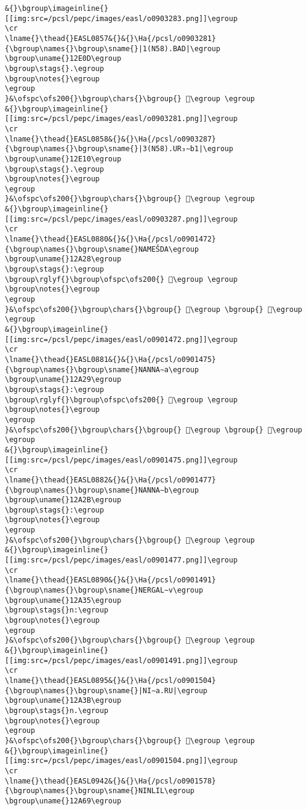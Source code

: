 \begin{verbatim}
&{}\bgroup\imageinline{}[[img:src=/pcsl/pepc/images/easl/o0903283.png]]\egroup
\cr
\lname{}\thead{}EASL0857&{}&{}\Ha{/pcsl/o0903281}{\bgroup\names{}\bgroup\sname{}|1(N58).BAD|\egroup
\bgroup\uname{}12E0D\egroup
\bgroup\stags{}.\egroup
\bgroup\notes{}\egroup
\egroup
}&\ofspc\ofs200{}\bgroup\chars{}\bgroup{} 𒸍\egroup \egroup
&{}\bgroup\imageinline{}[[img:src=/pcsl/pepc/images/easl/o0903281.png]]\egroup
\cr
\lname{}\thead{}EASL0858&{}&{}\Ha{/pcsl/o0903287}{\bgroup\names{}\bgroup\sname{}|3(N58).UR₃∼b1|\egroup
\bgroup\uname{}12E10\egroup
\bgroup\stags{}.\egroup
\bgroup\notes{}\egroup
\egroup
}&\ofspc\ofs200{}\bgroup\chars{}\bgroup{} 𒸐\egroup \egroup
&{}\bgroup\imageinline{}[[img:src=/pcsl/pepc/images/easl/o0903287.png]]\egroup
\cr
\lname{}\thead{}EASL0880&{}&{}\Ha{/pcsl/o0901472}{\bgroup\names{}\bgroup\sname{}NAMEŠDA\egroup
\bgroup\uname{}12A28\egroup
\bgroup\stags{}:\egroup
\bgroup\rglyf{}\bgroup\ofspc\ofs200{} 𒨨\egroup \egroup
\bgroup\notes{}\egroup
\egroup
}&\ofspc\ofs200{}\bgroup\chars{}\bgroup{} 𒨧\egroup \bgroup{} 𒨨\egroup \egroup
&{}\bgroup\imageinline{}[[img:src=/pcsl/pepc/images/easl/o0901472.png]]\egroup
\cr
\lname{}\thead{}EASL0881&{}&{}\Ha{/pcsl/o0901475}{\bgroup\names{}\bgroup\sname{}NANNA∼a\egroup
\bgroup\uname{}12A29\egroup
\bgroup\stags{}:\egroup
\bgroup\rglyf{}\bgroup\ofspc\ofs200{} 𒨩\egroup \egroup
\bgroup\notes{}\egroup
\egroup
}&\ofspc\ofs200{}\bgroup\chars{}\bgroup{} 𒨩\egroup \bgroup{} 𒨪\egroup \egroup
&{}\bgroup\imageinline{}[[img:src=/pcsl/pepc/images/easl/o0901475.png]]\egroup
\cr
\lname{}\thead{}EASL0882&{}&{}\Ha{/pcsl/o0901477}{\bgroup\names{}\bgroup\sname{}NANNA∼b\egroup
\bgroup\uname{}12A2B\egroup
\bgroup\stags{}:\egroup
\bgroup\notes{}\egroup
\egroup
}&\ofspc\ofs200{}\bgroup\chars{}\bgroup{} 𒨫\egroup \egroup
&{}\bgroup\imageinline{}[[img:src=/pcsl/pepc/images/easl/o0901477.png]]\egroup
\cr
\lname{}\thead{}EASL0890&{}&{}\Ha{/pcsl/o0901491}{\bgroup\names{}\bgroup\sname{}NERGAL∼v\egroup
\bgroup\uname{}12A35\egroup
\bgroup\stags{}n:\egroup
\bgroup\notes{}\egroup
\egroup
}&\ofspc\ofs200{}\bgroup\chars{}\bgroup{} 𒨵\egroup \egroup
&{}\bgroup\imageinline{}[[img:src=/pcsl/pepc/images/easl/o0901491.png]]\egroup
\cr
\lname{}\thead{}EASL0895&{}&{}\Ha{/pcsl/o0901504}{\bgroup\names{}\bgroup\sname{}|NI∼a.RU|\egroup
\bgroup\uname{}12A3B\egroup
\bgroup\stags{}n.\egroup
\bgroup\notes{}\egroup
\egroup
}&\ofspc\ofs200{}\bgroup\chars{}\bgroup{} 𒨻\egroup \egroup
&{}\bgroup\imageinline{}[[img:src=/pcsl/pepc/images/easl/o0901504.png]]\egroup
\cr
\lname{}\thead{}EASL0942&{}&{}\Ha{/pcsl/o0901578}{\bgroup\names{}\bgroup\sname{}NINLIL\egroup
\bgroup\uname{}12A69\egroup

\end{verbatim}
